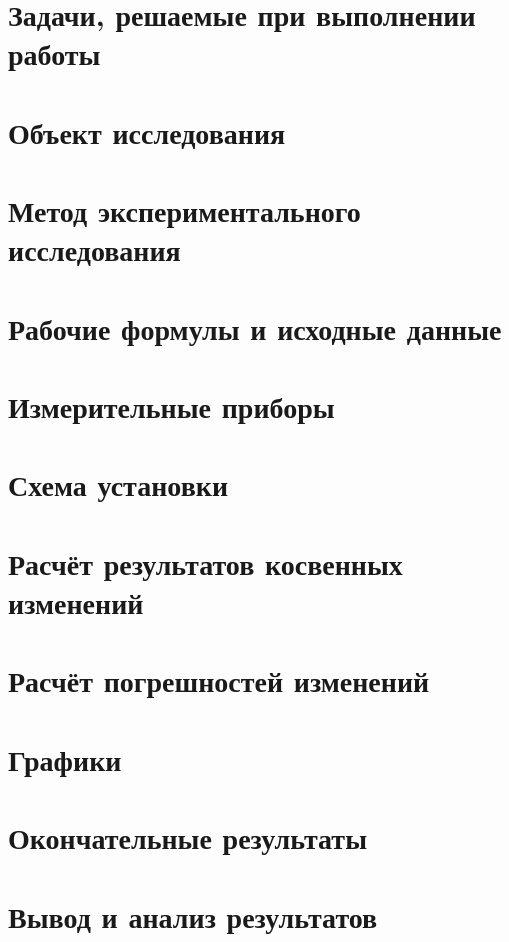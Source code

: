 \documentclass[14pt]{extarticle}
\begin{document}
    \section{Задачи, решаемые при выполнении работы}
    
    \section{Объект исследования}
    
    \section{Метод экспериментального исследования}
    
    \section{Рабочие формулы и исходные данные}

    \section{Измерительные приборы}

    \section{Схема установки}

    \section{Расчёт результатов косвенных изменений}

    \section{Расчёт погрешностей изменений}
 
    \section{Графики}

    \section{Окончательные результаты}

    \section{Вывод и анализ результатов}

    
\end{document}
